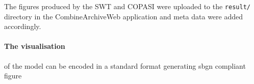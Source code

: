 The figures produced by the SWT and COPASI were uploaded to the \texttt{result/} directory in the CombineArchiveWeb application and meta data were added accordingly.



\paragraph{The visualisation} of the model can be encoded in a standard format
generating sbgn compliant figure



